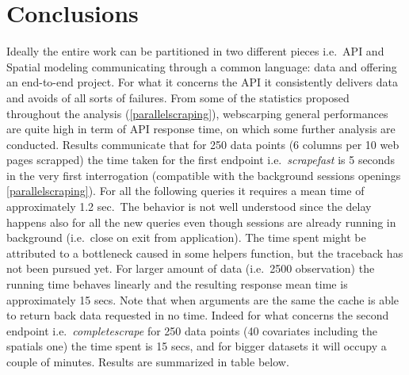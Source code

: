 \documentclass[
  12pt,
  a4paper,
  oneside]{book}
\theoremstyle{definition}
\theoremstyle{definition}
\theoremstyle{definition}
\theoremstyle{remark}
\begin{document}
\hypertarget{conclusions}{%
\chapter{Conclusions}\label{conclusions}}

Ideally the entire work can be partitioned in two different pieces i.e.~API and Spatial modeling communicating through a common language: data and offering an end-to-end project. For what it concerns the API it consistently delivers data and avoids of all sorts of failures. From some of the statistics proposed throughout the analysis (\ref{parallelscraping}), webscarping general performances are quite high in term of API response time, on which some further analysis are conducted. Results communicate that for 250 data points (6 columns per 10 web pages scrapped) the time taken for the first endpoint i.e.~\emph{scrapefast} is 5 seconds in the very first interrogation (compatible with the background sessions openings \ref{parallelscraping}). For all the following queries it requires a mean time of approximately 1.2 sec.~The behavior is not well understood since the delay happens also for all the new queries even though sessions are already running in background (i.e.~close on exit from application). The time spent might be attributed to a bottleneck caused in some helpers function, but the traceback has not been pursued yet. For larger amount of data (i.e.~2500 observation) the running time behaves linearly and the resulting response mean time is approximately 15 secs. Note that when arguments are the same the cache is able to return back data requested in no time.
Indeed for what concerns the second endpoint i.e.~\emph{completescrape} for 250 data points (40 covariates including the spatials one) the time spent is 15 secs, and for bigger datasets it will occupy a couple of minutes. Results are summarized in table below.
\end{document}
